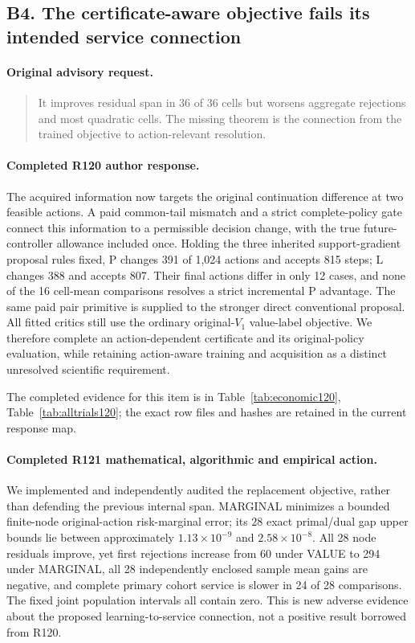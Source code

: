 \subsection{B4. The certificate-aware objective fails its intended service connection}
\label{response122:B4}

\paragraph{Original advisory request.}
\begin{quote}
It improves residual span in 36 of 36 cells but worsens aggregate rejections and most quadratic cells. The missing theorem is the connection from the trained objective to action-relevant resolution.
\end{quote}

\paragraph{Completed R120 author response.}
The acquired information now targets the original continuation difference at two feasible actions. A paid common-tail mismatch and a strict complete-policy gate connect this information to a permissible decision change, with the true future-controller allowance included once. Holding the three inherited support-gradient proposal rules fixed, P changes 391 of 1,024 actions and accepts 815 steps; L changes 388 and accepts 807. Their final actions differ in only 12 cases, and none of the 16 cell-mean comparisons resolves a strict incremental P advantage. The same paid pair primitive is supplied to the stronger direct conventional proposal. All fitted critics still use the ordinary original-$V_1$ value-label objective. We therefore complete an action-dependent certificate and its original-policy evaluation, while retaining action-aware training and acquisition as a distinct unresolved scientific requirement.

The completed evidence for this item is in Table~\ref{tab:economic120}, Table~\ref{tab:alltrials120}; the exact row files and hashes are retained in the current response map.

\paragraph{Completed R121 mathematical, algorithmic and empirical action.}
We implemented and independently audited the replacement objective, rather than defending the previous internal span. MARGINAL minimizes a bounded finite-node original-action risk-marginal error; its 28 exact primal/dual gap upper bounds lie between approximately $1.13\times10^{-9}$ and $2.58\times10^{-8}$. All 28 node residuals improve, yet first rejections increase from 60 under VALUE to 294 under MARGINAL, all 28 independently enclosed sample mean gains are negative, and complete primary cohort service is slower in 24 of 28 comparisons. The fixed joint population intervals all contain zero. This is new adverse evidence about the proposed learning-to-service connection, not a positive result borrowed from R120.


